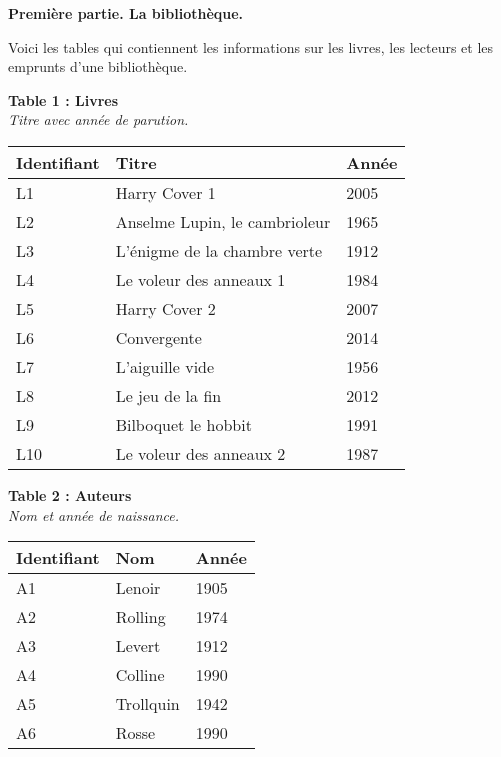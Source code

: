 \documentclass[class=report,crop=false, 12pt]{standalone}
\begin{document}
\newcommand{\ducode}[1]{\textsf{#1}}



\textbf{Première partie. La bibliothèque.}

Voici les tables qui contiennent les informations sur les livres, les lecteurs et les emprunts d'une bibliothèque.

\bigskip

{\footnotesize
\begin{minipage}{0.7\textwidth}

\textbf{Table 1 : Livres}\\
\emph{Titre avec année de parution.} \\

\begin{tabular}{|l|l|l|} \hline
\textbf{Identifiant} & \textbf{Titre} & \textbf{Année} \\ \hline\hline
L1 & Harry Cover 1 & 2005 \\ \hline
L2 & Anselme Lupin, le cambrioleur & 1965 \\ \hline
L3 & L'énigme de la chambre verte & 1912 \\ \hline
L4 & Le voleur des anneaux 1 & 1984 \\ \hline
L5 & Harry Cover 2 & 2007 \\ \hline 
L6 & Convergente & 2014 \\ \hline
L7 & L'aiguille vide & 1956 \\ \hline
L8 & Le jeu de la fin & 2012 \\ \hline 
L9 & Bilboquet le hobbit & 1991 \\ \hline
L10 & Le voleur des anneaux 2 & 1987 \\ \hline 
\end{tabular}
\end{minipage}
%
%
\begin{minipage}{0.25\textwidth}

\textbf{Table 2 : Auteurs}\\
\emph{Nom et année de naissance.} \\

\begin{tabular}{|l|l|l|} \hline
\textbf{Identifiant} & \textbf{Nom} & \textbf{Année} \\ \hline\hline
A1 & Lenoir & 1905 \\ \hline
A2 & Rolling & 1974 \\ \hline
A3 & Levert & 1912 \\ \hline
A4 & Colline & 1990 \\ \hline
A5 & Trollquin & 1942 \\ \hline
A6 & Rosse & 1990 \\ \hline 
\end{tabular}
\end{minipage}
}
%
%
\end{document}
